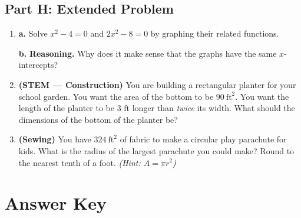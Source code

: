 \documentclass[12pt]{article}
\begin{document}
\subsection*{Part H: Extended Problem}

\begin{enumerate}[leftmargin=*, label=\textbf{\arabic*.}, start=28]

  \item \textbf{a.} Solve $x^2 - 4 = 0$ and $2x^2 - 8 = 0$ by graphing their related functions.

  \vspace{4cm}

  \textbf{b.} \textbf{Reasoning.} Why does it make sense that the graphs have the same $x$-intercepts?

  \vspace{3cm}

  \item \textbf{(STEM — Construction)} You are building a rectangular planter for your school
        garden. You want the area of the bottom to be $90\ \text{ft}^2$. You want the length of
        the planter to be 3 ft longer than \emph{twice} its width. What should the dimensions of
        the bottom of the planter be?

  \vspace{5cm}

  \item \textbf{(Sewing)} You have $324\ \text{ft}^2$ of fabric to make a circular play parachute
        for kids. What is the radius of the largest parachute you could make? Round to the nearest
        tenth of a foot. \textit{(Hint: $A = \pi r^2$)}

  \vspace{4cm}

\end{enumerate}

\newpage
\section*{Answer Key}
\end{document}
